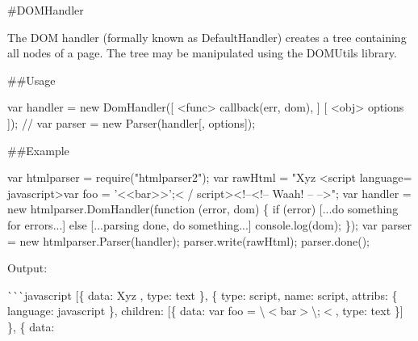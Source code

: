 \#\+D\+O\+M\+Handler \href{http://travis-ci.org/fb55/DomHandler}{\tt }

The D\+OM handler (formally known as Default\+Handler) creates a tree containing all nodes of a page. The tree may be manipulated using the D\+O\+M\+Utils library.

\#\#\+Usage 
\begin{DoxyCode}
var handler = new DomHandler([ <func> callback(err, dom), ] [ <obj> options ]);
// var parser = new Parser(handler[, options]);
\end{DoxyCode}


\#\#\+Example 
\begin{DoxyCode}
var htmlparser = require("htmlparser2");
var rawHtml = "Xyz <script language= javascript>var foo = '<<bar>>';< /  script><!--<!-- Waah! -- -->";
var handler = new htmlparser.DomHandler(function (error, dom) \{
    if (error)
        [...do something for errors...]
    else
        [...parsing done, do something...]
        console.log(dom);
\});
var parser = new htmlparser.Parser(handler);
parser.write(rawHtml);
parser.done();
\end{DoxyCode}


Output\+:

\`{}\`{}\`{}javascript \mbox{[}\{ data\+: \textquotesingle{}Xyz \textquotesingle{}, type\+: \textquotesingle{}text\textquotesingle{} \}, \{ type\+: \textquotesingle{}script\textquotesingle{}, name\+: \textquotesingle{}script\textquotesingle{}, attribs\+: \{ language\+: \textquotesingle{}javascript\textquotesingle{} \}, children\+: \mbox{[}\{ data\+: \textquotesingle{}var foo = \textbackslash{}\textquotesingle{}$<$bar$>$\textbackslash{}\textquotesingle{};$<$\textquotesingle{}, type\+: \textquotesingle{}text\textquotesingle{} \}\mbox{]} \}, \{ data\+: \textquotesingle{} 